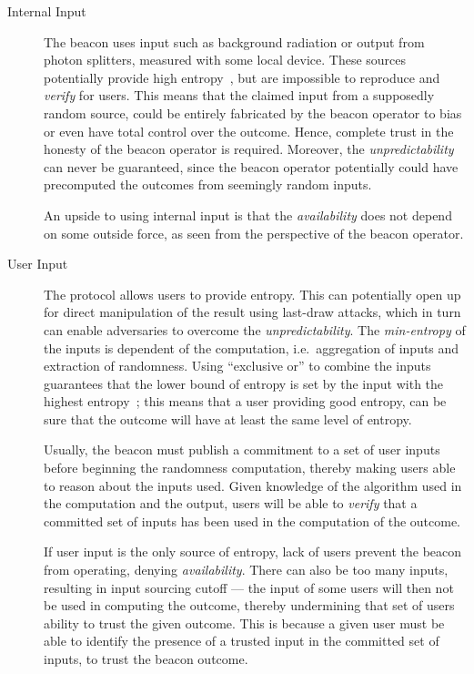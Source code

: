 \begin{description}

    \item[Internal Input]
        The beacon uses input such as background radiation or output from photon splitters, measured with some local device.
        These sources potentially provide high entropy~\cite{nistbeacon}, but are impossible to reproduce and \emph{verify} for users.
        This means that the claimed input from a supposedly random source, could be entirely fabricated by the beacon operator to bias or even have total control over the outcome.
        Hence, complete trust in the honesty of the beacon operator is required.
        Moreover, the \emph{unpredictability} can never be guaranteed, since the beacon operator potentially could have precomputed the outcomes from seemingly random inputs.

        An upside to using internal input is that the \emph{availability} does not depend on some outside force, as seen from the perspective of the beacon operator.
    \item[User Input]
        The protocol allows users to provide entropy.
        This can potentially open up for direct manipulation of the result using last-draw attacks, which in turn can enable adversaries to overcome the \emph{unpredictability}.
        The \emph{min-entropy} of the inputs is dependent of the computation, i.e.\ aggregation of inputs and extraction of randomness.
        Using \enquote{exclusive or} to combine the inputs guarantees that the lower bound of entropy is set by the input with the highest entropy~\cite{lenstra2015random};
        this means that a user providing good entropy, can be sure that the outcome will have at least the same level of entropy.

        Usually, the beacon must publish a commitment to a set of user inputs before beginning the randomness computation,  thereby making users able to reason about the inputs used.
        Given knowledge of the algorithm used in the computation and the output, users will be able to \emph{verify} that a committed set of inputs has been used in the computation of the outcome.

        If user input is the only source of entropy, lack of users prevent the beacon from operating, denying \emph{availability}.
        There can also be too many inputs, resulting in input sourcing cutoff ---
        the input of some users will then not be used in computing the outcome, thereby undermining that set of users ability to trust the given outcome.
        This is because a given user must be able to identify the presence of a trusted input in the committed set of inputs, to trust the beacon outcome.


\end{description}
